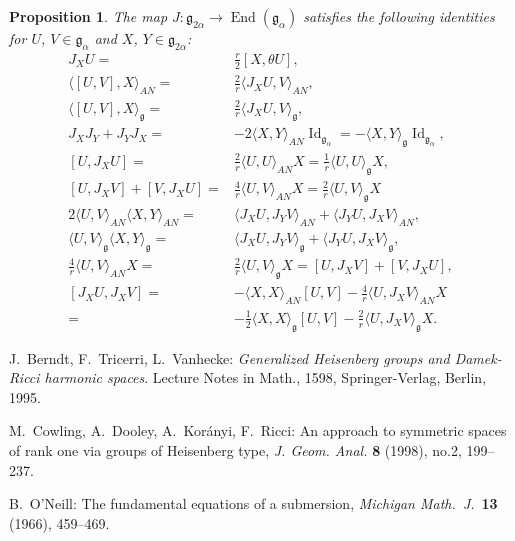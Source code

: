 \documentclass[12pt, a4paper,draft]{amsart}
\newcommand{\g}{\mathfrak}
\newtheorem{proposition}[theorem]{Proposition}
\theoremstyle{remark}
\begin{document}
\begin{proposition}
	The map $J\colon \g{g}_{2\alpha}\to\operatorname{End}(\g{g}_{\alpha})$ satisfies the following identities for $U$, $V\in\g{g}_{\alpha}$ and $X$, $Y\in\g{g}_{2\alpha}$:
	\begin{equation*}
		\begin{split}
			J_{X}U={}&\frac{r}{2}[X,\theta U],\\
			\langle [U,V],X\rangle_{AN}={}&\frac{2}{r}\langle J_{X}U,V\rangle_{AN},\\
			\langle [U,V],X\rangle_{\g{g}}={}&\frac{2}{r}\langle J_{X}U,V\rangle_{\g{g}}, \\
			J_{X}J_{Y}+J_{Y}J_{X}={}&-2\langle X,Y\rangle_{AN}\operatorname{Id}_{\g{g}_{\alpha}}=-\langle X,Y\rangle_{\g{g}}\operatorname{Id}_{\g{g}_{\alpha}},\\
			[U,J_{X}U]={}&\frac{2}{r}\langle U,U\rangle_{AN}X=\frac{1}{r}\langle U,U\rangle_{\g{g}}X,\\
			[U,J_X V]+[V,J_X U]={}&\frac{4}{r}\langle U,V\rangle_{AN}X
				=\frac{2}{r}\langle U,V\rangle_{\g{g}}X\\[1ex]
			2\langle U,V\rangle_{AN}\langle X,Y\rangle_{AN}={}&\langle J_{X}U,J_{Y}V \rangle_{AN}+\langle J_{Y}U,J_{X}V\rangle_{AN}, \\[1ex]
			\langle U,V\rangle_{\g{g}}\langle X,Y\rangle_{\g{g}}={}&\langle J_{X}U,J_{Y}V \rangle_{\g{g}}+\langle J_{Y}U,J_{X}V\rangle_{\g{g}},\\
			\frac{4}{r}\langle U,V \rangle_{AN} X={}&\frac{2}{r}\langle U,V\rangle_{\g{g}}X=[U,J_{X}V]+[V,J_{X}U],\\
			[J_{X}U,J_{X}V]={}&-\langle X,X\rangle_{AN}[U,V]-\frac{4}{r}\langle U,J_{X}V\rangle_{AN}X\\
			={}&-\frac{1}{2}\langle X,X\rangle_{\g{g}}[U,V]-\frac{2}{r}\langle U,J_{X}V\rangle_{\g{g}}X.
		\end{split}
	\end{equation*}
\end{proposition}

\begin{thebibliography}{99}
J.~Berndt, F.~Tricerri, L.~Vanhecke: \textit{Generalized Heisenberg groups and Damek-Ricci harmonic spaces}. Lecture Notes in Math., 1598, Springer-Verlag, Berlin, 1995.

 M.~Cowling, A.~Dooley, A.~Kor\'{a}nyi, F.~Ricci: An approach to symmetric spaces of rank one via groups of Heisenberg type, \textit{J. Geom. Anal.} \textbf{8} (1998), no.2, 199--237.

B.~O'Neill: The fundamental equations of a submersion, \textit{Michigan Math.\ J.}\ \textbf{13} (1966), 459--469.
\end{thebibliography}
\end{document}
